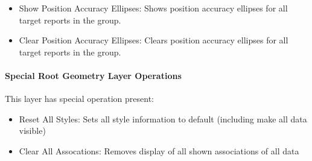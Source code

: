 \begin{itemize}
 \item Show Position Accuracy Ellipses: Shows position accuracy ellipses for all target reports in the group.
 \item Clear Position Accuracy Ellipses: Clears position accuracy ellipses for all target reports in the group.
\end{itemize} 

\paragraph{Special Root Geometry Layer Operations}
This layer has special operation present:

\begin{itemize}
 \item Reset All Styles: Sets all style information to default (including make all data visible)
 \item Clear All Assocations: Removes display of all shown associations of all data
\end{itemize} 
